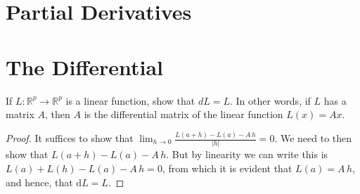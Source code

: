 \documentclass[12pt]{book}
\newcommand{\R}{\mathbb{R}}
\newenvironment{exercise}[2][Exercise]{\begin{trivlist}
\item[\hskip \labelsep {\bfseries #1}\hskip \labelsep {\bfseries #2.}]}{\end{trivlist}}
\begin{document}
\section{Partial Derivatives}



\section{The Differential}


\begin{exercise}{9.2.1}
	If $L: \R^p \to \R^p$ is a linear function, show that $dL=L$. In other words, if $L$ has a matrix $A$, then $A$ is the differential matrix of the linear function $L(x)=A x$.

	\begin{proof}
    It suffices to show that $\lim_{h \to 0} \frac{L(a+h)-L(a)-A\,h}{|h|}=0$. We need to then show that $L(a+h)-L(a)-A\,h$. But by linearity we can write this is $L(a)+L(h)-L(a)-A\,h =0 $, from which it is evident that $L(a)=A\,h$, and hence, that $\text{d}L=L$.
	\end{proof}
\end{exercise}
\end{document}

